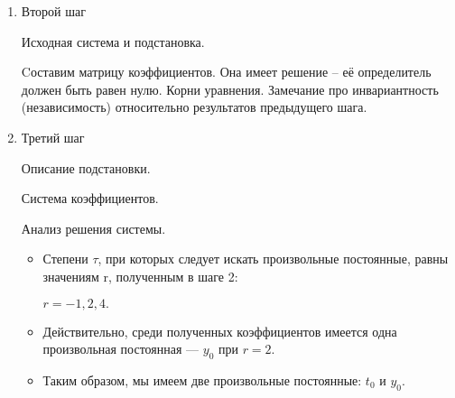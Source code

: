 \begin{itemize}
\begin{enumerate}
    \item{Второй шаг}

      Исходная система и подстановка.

      Cоставим матрицу коэффициентов. Она имеет решение -- её определитель должен быть равен нулю. Корни уравнения. Замечание про инвариантность (независимость) относительно результатов предыдущего шага.

    \item{Третий шаг}

      Описание подстановки. 

      Система коэффициентов.

      Анализ решения системы.
      
      \begin{itemize}
      \item
Степени $ \tau $, при которых следует искать произвольные постоянные, равны значениям r, полученным в шаге 2: 
\begin{center}
$ r = -1, 2, 4. $ 
\end{center}

\item
Действительно, среди полученных коэффициентов имеется одна произвольная постоянная --- $ y_0 $ при $ r = 2 $.

\item
Таким образом, мы имеем две произвольные постоянные: $ t_0 $ и $ y_0 $.
	\end{itemize}
      
  \end{enumerate}



\end{itemize}
